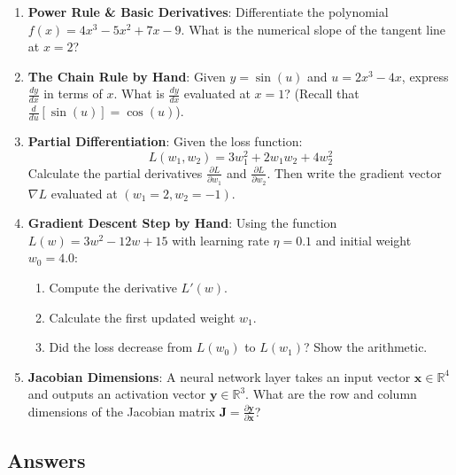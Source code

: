 \begin{enumerate}
    \item \textbf{Power Rule \& Basic Derivatives}: Differentiate the polynomial $f(x) = 4x^3 - 5x^2 + 7x - 9$. What is the numerical slope of the tangent line at $x = 2$?

    \item \textbf{The Chain Rule by Hand}: Given $y = \sin(u)$ and $u = 2x^3 - 4x$, express $\frac{dy}{dx}$ in terms of $x$. What is $\frac{dy}{dx}$ evaluated at $x = 1$? (Recall that $\frac{d}{du}[\sin(u)] = \cos(u)$).

    \item \textbf{Partial Differentiation}: Given the loss function:
    \begin{equation*}
    L(w_1, w_2) = 3w_1^2 + 2w_1 w_2 + 4w_2^2
    \end{equation*}
    Calculate the partial derivatives $\frac{\partial L}{\partial w_1}$ and $\frac{\partial L}{\partial w_2}$. Then write the gradient vector $\nabla L$ evaluated at $(w_1 = 2, w_2 = -1)$.

    \item \textbf{Gradient Descent Step by Hand}: Using the function $L(w) = 3w^2 - 12w + 15$ with learning rate $\eta = 0.1$ and initial weight $w_0 = 4.0$:
    \begin{enumerate}[label=(\alph*)]
        \item Compute the derivative $L'(w)$.
        \item Calculate the first updated weight $w_1$.
        \item Did the loss decrease from $L(w_0)$ to $L(w_1)$? Show the arithmetic.
    \end{enumerate}

    \item \textbf{Jacobian Dimensions}: A neural network layer takes an input vector $\mathbf{x} \in \mathbb{R}^4$ and outputs an activation vector $\mathbf{y} \in \mathbb{R}^3$. What are the row and column dimensions of the Jacobian matrix $\mathbf{J} = \frac{\partial \mathbf{y}}{\partial \mathbf{x}}$?
\end{enumerate}

\subsection*{Answers}

